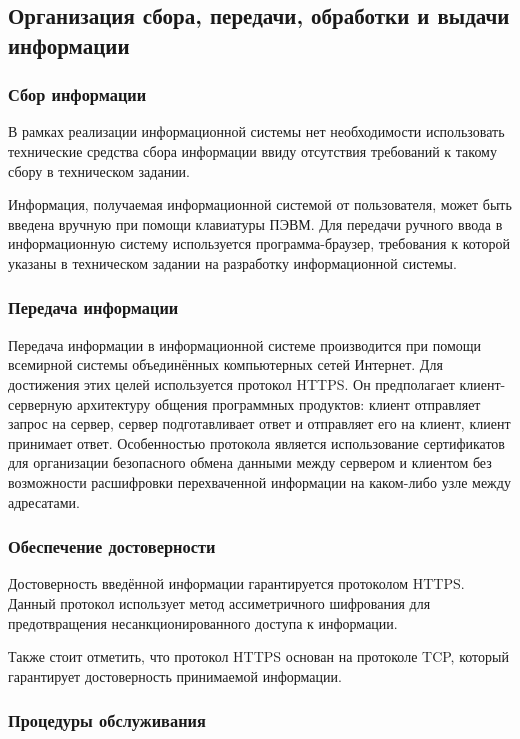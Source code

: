 \subsection{Организация сбора, передачи, обработки и выдачи информации}

\subsubsection{Сбор информации}

В рамках реализации информационной системы нет необходимости использовать технические средства сбора информации ввиду отсутствия требований к такому сбору в техническом задании.

Информация, получаемая информационной системой от пользователя, может быть введена вручную при помощи клавиатуры ПЭВМ.
Для передачи ручного ввода в информационную систему используется программа-браузер, требования к которой указаны в техническом задании на разработку информационной системы.

\subsubsection{Передача информации}

Передача информации в информационной системе производится при помощи всемирной системы объединённых компьютерных сетей Интернет.
Для достижения этих целей используется протокол HTTPS.
Он предполагает клиент-серверную архитектуру общения программных продуктов: клиент отправляет запрос на сервер, сервер подготавливает ответ и отправляет его на клиент, клиент принимает ответ.
Особенностью протокола является использование сертификатов для организации безопасного обмена данными между сервером и клиентом без возможности расшифровки перехваченной информации на каком-либо узле между адресатами.

\subsubsection{Обеспечение достоверности}

Достоверность введённой информации гарантируется протоколом HTTPS.
Данный протокол использует метод ассиметричного шифрования для предотвращения несанкционированного доступа к информации.

Также стоит отметить, что протокол HTTPS основан на протоколе TCP, который гарантирует достоверность принимаемой информации.

\subsubsection{Процедуры обслуживания}

